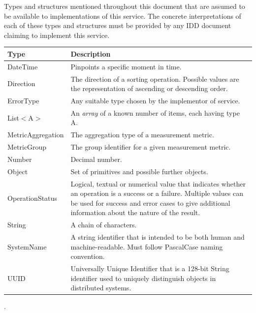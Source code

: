 \documentclass[a4paper]{arrowhead}
\newcommand{\pdef}[1]{{\textcolor{ArrowheadGrey}{#1\label{sec:model:primitives:#1}\label{sec:model:primitives:#1s}\label{sec:model:primitives:#1es}}}}
\begin{document}
Types and structures mentioned throughout this document that are assumed to be available to implementations of this service.
The concrete interpretations of each of these types and structures must be provided by any IDD document claiming to implement this service.


\begin{table}[ht!]
\begin{tabularx}{\textwidth}{| p{4.3cm} | X |} \hline
\rowcolor{gray!33} Type & Description \\ \hline
\pdef{DateTime}         & Pinpoints a specific moment in time. \\ \hline
\pdef{Direction}        & The direction of a sorting operation. Possible values are the representation of ascending or descending order. \\ \hline
\pdef{ErrorType}        & Any suitable type chosen by the implementor of service. \\ \hline
\pdef{List}$<$A$>$      & An \textit{array} of a known number of items, each having type A. \\ \hline
\pdef{MetricAggregation} & The aggregation type of a measurement metric. \\ \hline
\pdef{MetricGroup}      & The group identifier for a given measurement metric. \\ \hline 
\pdef{Number}           & Decimal number. \\ \hline
\pdef{Object}           & Set of primitives and possible further objects. \\ \hline
\pdef{OperationStatus}  & Logical, textual or numerical value that indicates whether an operation is a success or a failure. Multiple values can be used for success and error cases to give additional information about the nature of the result. \\ \hline
\pdef{String}           & A chain of characters. \\ \hline
\pdef{SystemName}             & A string identifier that is intended to be both human and machine-readable. Must follow PascalCase naming convention. \\ \hline
\pdef{UUID}             & Universally Unique Identifier that is a 128-bit String identifier used to uniquely distinguish objects in distributed systems. \\ \hline
\end{tabularx}.
\end{table}

\newpage



\end{document}
